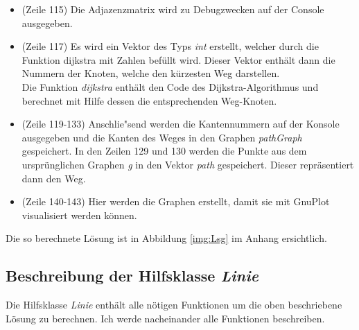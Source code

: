 \documentclass[a4paper]{scrartcl}
\begin{document}
\begin{itemize}
\begin{itemize}
	\end{itemize}
	\item (Zeile 115) Die Adjazenzmatrix wird zu Debugzwecken auf der Console ausgegeben.
	\item (Zeile 117) Es wird ein Vektor des Typs \textit{int} erstellt, welcher durch die Funktion dijkstra mit Zahlen befüllt wird. Dieser Vektor enthält dann die Nummern der Knoten, welche den kürzesten Weg darstellen.\\
	Die Funktion \textit{dijkstra} enthält den Code des Dijkstra-Algorithmus und berechnet mit Hilfe dessen die entsprechenden Weg-Knoten.
	\item (Zeile 119-133) Anschlie"send werden die Kantennummern auf der Konsole ausgegeben und die Kanten des Weges in den Graphen \textit{pathGraph} gespeichert. In den Zeilen 129 und 130 werden die Punkte aus dem ursprünglichen Graphen \textit{g} in den Vektor \textit{path} gespeichert. Dieser repräsentiert dann den Weg.
	\item (Zeile 140-143) Hier werden die Graphen erstellt, damit sie mit GnuPlot visualisiert werden können.
\end{itemize}

Die so berechnete Lösung ist in Abbildung \ref{img:Lsg} im Anhang ersichtlich.

\subsection*{Beschreibung der Hilfsklasse \textit{Linie}}
Die Hilfsklasse \textit{Linie} enthält alle nötigen Funktionen um die oben beschriebene Lösung zu berechnen. Ich werde nacheinander alle Funktionen beschreiben.
\end{document}
